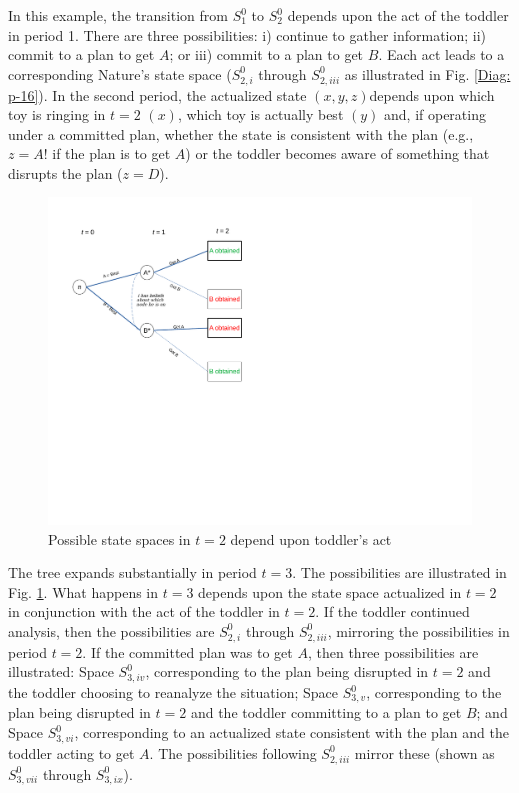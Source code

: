 \documentclass[
11pt,
titlepage,
reqno,
]{article}%
\theoremstyle{definition}
\begin{document}
In this example, the transition from $S^0_1$ to $S^0_2$ depends upon the act of the toddler in period 1. There are three possibilities: i) continue to gather information; ii) commit to a plan to get $A$; or iii) commit to a plan to get $B$. Each act leads to a corresponding Nature's state space ($S^0_{2,i}$ through $S^0_{2,iii}$ as illustrated in Fig. \ref{Diag: p-16}). In the second period, the actualized state $(x,y,z) $depends upon which toy is ringing in $t=2$ $(x)$,  which toy is actually best $(y)$ and, if operating under a committed plan, whether the state is consistent with the plan (e.g., $z=A!$ if the plan is to get $A$) or the toddler becomes aware of something that disrupts the plan ($z=D$).

\begin{figure}[h!]
	\centering
	\includegraphics*[page=17,trim = 0in 0in 0in 0in,scale=.65]{Awareness_Diagrams_All}
	\caption{Possible state spaces in $t=2$ depend upon toddler's act\label{Diag: p-17}}%
\end{figure}

The tree expands substantially in period $t=3$. The possibilities are illustrated in Fig. \ref{Diag: p-17}. What happens in $t=3$ depends upon the state space actualized in $t=2$ in conjunction with the act of the toddler in $t=2$. If the toddler continued analysis, then the possibilities are $S^0_{2,i}$ through $S^0_{2,iii}$, mirroring the possibilities in period $t=2$. If the committed plan was to get $A$, then three possibilities are illustrated: Space $S^0_{3,iv}$, corresponding to the plan being disrupted in $t=2$ and the toddler choosing to reanalyze the situation; Space $S^0_{3,v}$, corresponding to the plan being disrupted in $t=2$ and the toddler committing to a plan to get $B$; and Space $S^0_{3,vi}$, corresponding to an actualized state consistent with the plan and the toddler acting to get $A$. The possibilities following $S^0_{2,iii}$ mirror these (shown as $S^0_{3,vii}$ through $S^0_{3,ix}$).
\end{document}
